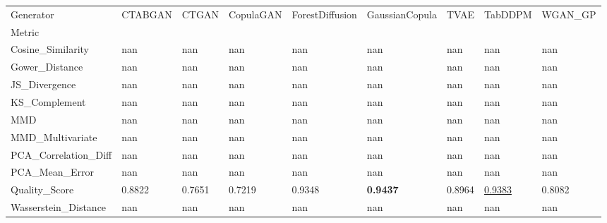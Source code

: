 \begin{tabular}{lllllllll}
\toprule
Generator & CTABGAN & CTGAN & CopulaGAN & ForestDiffusion & GaussianCopula & TVAE & TabDDPM & WGAN_GP \\
Metric &  &  &  &  &  &  &  &  \\
\midrule
Cosine_Similarity & nan & nan & nan & nan & nan & nan & nan & nan \\
Gower_Distance & nan & nan & nan & nan & nan & nan & nan & nan \\
JS_Divergence & nan & nan & nan & nan & nan & nan & nan & nan \\
KS_Complement & nan & nan & nan & nan & nan & nan & nan & nan \\
MMD & nan & nan & nan & nan & nan & nan & nan & nan \\
MMD_Multivariate & nan & nan & nan & nan & nan & nan & nan & nan \\
PCA_Correlation_Diff & nan & nan & nan & nan & nan & nan & nan & nan \\
PCA_Mean_Error & nan & nan & nan & nan & nan & nan & nan & nan \\
Quality_Score & 0.8822 & 0.7651 & 0.7219 & 0.9348 & \textbf{0.9437} & 0.8964 & \underline{0.9383} & 0.8082 \\
Wasserstein_Distance & nan & nan & nan & nan & nan & nan & nan & nan \\
\bottomrule
\end{tabular}
